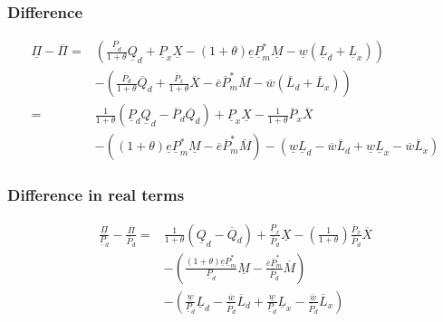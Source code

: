 \subsubsection*{Difference}
\begin{equation}
\begin{aligned}
\underline \Pi - \overline \Pi = & \left( \frac{\underline P_d}{1+\theta}\underline Q_d +\underline P_x\underline X -  \left( 1+\theta \right) \underline e \underline P^*_m \underline M -  \underline w  \left( \underline L_d + \underline L_x \right)  \right)  \\ &-  \left( \frac{\overline P_d}{1+\theta}\overline Q_d + \frac{\overline P_x}{1+\theta}\overline X - \overline e \overline P^*_m \overline M - \overline w  \left( \overline L_d + \overline L_x \right)  \right) \\ 
= &\frac{1}{1+\theta}  \left( \underline P_d \underline Q_d - \overline P_d  \overline Q_d \right)  +\underline P_x\underline X - \frac{1}{1+\theta}\overline P_x \overline X \\ &-  \left(  \left( 1 + \theta \right) \underline e \underline P^*_m \underline M - \overline e \overline P^*_m \overline M \right)  -  \left( \underline w \underline L_d - \overline w \overline L_d + \underline w \underline L_x - \overline w \overline L_x \right) 
\end{aligned}
\end{equation}

\subsubsection*{Difference in real terms}
\begin{equation}
\begin{aligned}
\frac{\underline \Pi}{\underline P_d} - \frac{\overline \Pi}{\overline P_d} = &\frac{1}{1+\theta} \left( \underline Q_d - \overline Q_d \right)  + \frac{\underline P_x}{\overline P_d}\underline X -  \left( \frac{1}{1+\theta} \right) \frac{\overline P_x}{\overline P_d}\overline X \\ &-  \left( \frac{ \left( 1+\theta \right) \underline e \underline P^*_m}{\underline P_d}\underline M - \frac{\overline e \overline P^*_m}{\overline P_d}\overline M \right)  \\ &-  \left( \frac {\underline w}{\underline P_d} \underline L_d - \frac {\overline w}{\overline P_d} \overline L_d + \frac {\underline w}{\underline P_d} \underline L_x - \frac {\overline w}{\overline P_d} \overline L_x \right) 
\end{aligned}
\end{equation}

